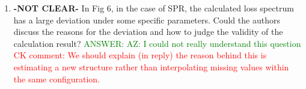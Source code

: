 \documentclass{article}
\begin{document}
\begin{enumerate}
\item \textbf{-NOT CLEAR-} In Fig 6, in the case of SPR, the calculated loss spectrum has a large deviation under some specific parameters. Could the authors discuss the reasons for the deviation and how to judge the validity of the calculation result?
\textcolor{green}{ANSWER: AZ: I could not really understand this question} \\
\textcolor{red}{CK comment: We should explain (in reply) the reason behind this is estimating a new structure rather than interpolating missing values within the same configuration.}

\end{enumerate}
\end{document}
